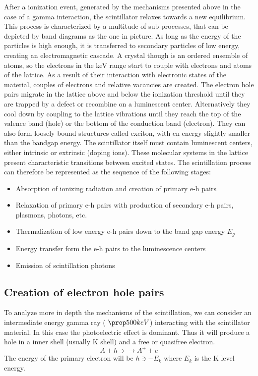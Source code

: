After a ionization event, generated by the mechanisms presented above in the case of a gamma interaction, the scintillator relaxes towards a new equilibrium. This process is characterized by a multitude of sub processes, that can be depicted by band diagrams as the one in picture.
As long as the energy of the particles is high enough, it is transferred to secondary particles of low energy, creating an electromagnetic cascade.
A crystal though is an ordered ensemble of atoms, so the electrons in the keV range start to couple with electrons and atoms of the lattice. As a result of their interaction with electronic states of the material, couples of electrons and relative vacancies are created. The electron hole pairs migrate in the lattice above and below the ionization threshold until they are trapped by a defect or recombine on a luminescent center. Alternatively they cool down by coupling to the lattice vibrations until they reach the top of the valence band (hole) or the bottom of the conduction band (electron). They can also form loosely bound structures called exciton, with en energy slightly smaller than the bandgap energy.
The scintillator itself must contain luminescent centers, either intrinsic or extrinsic (doping ions). These molecular systems in the lattice present characteristic transitions between excited states.
The scintillation process can therefore be represented as the sequence of the following stages\cite{Rodnyi1997}: 

\begin{itemize}
\item Absorption of ionizing radiation and creation of primary e-h pairs
\item Relaxation of primary e-h pairs with production of secondary e-h pairs, plasmons, photons, etc.
\item Thermalization of low energy e-h pairs down to the band gap energy $E_{g}$
\item Energy transfer form the e-h pairs to the luminescence centers
\item Emission of scintillation photons
\end{itemize}

\subsection{Creation of electron hole pairs}

To analyze more in depth the mechanisms of the scintillation, we can consider an intermediate energy gamma ray ( $\prop 500 keV$) interacting with the scintillator material. In this case the photoelectric effect is dominant. Thus it will produce a hole in a inner shell (usually K shell) and a free or quasifree electron.
\begin{equation}
A + h\ni \rightarrow A^{+} + e
\end{equation}
The energy of the primary electron will be $h\ni - E_{k}$ where $E_{k}$ is the K level energy.

